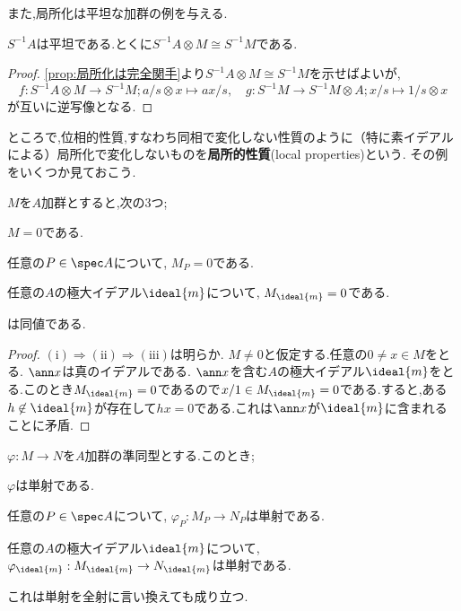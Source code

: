 また,局所化は平坦な加群の例を与える.
\begin{prop}\label{prop:局所化は平坦}
	$S^{-1}A$は平坦である.とくに$S^{-1}A\otimes M\cong S^{-1}M$である.
\end{prop}

\begin{proof}
	\ref{prop:局所化は完全関手}より$S^{-1}A\otimes M\cong S^{-1}M$を示せばよいが,	
	\[f:S^{-1}A\otimes M\to S^{-1}M;a/s\otimes x\mapsto ax/s,\quad g:S^{-1}M\to S^{-1}M\otimes A;x/s\mapsto 1/s\otimes x\]
	が互いに逆写像となる.
\end{proof}

ところで,位相的性質,すなわち同相で変化しない性質のように（特に素イデアルによる）局所化で変化しないものを\textbf{局所的性質}(local properties)という. その例をいくつか見ておこう.

\begin{prop}\label{prop:局所化したら0は局所的}
	$M$を$A$加群とすると,次の3つ;
	\begin{sakura}
		\item $M=0$である.
		\item 任意の$P\in \spec A$について, $M_P=0$である.
		\item 任意の$A$の極大イデアル$\ideal{m}$について, $M_{\ideal{m}}=0$である.
	\end{sakura}
	は同値である.
\end{prop}

\begin{proof}
	$(\text{i})\Longrightarrow(\text{ii})\Longrightarrow(\text{iii})$は明らか. $M\neq0$と仮定する.任意の$0\neq x\in M$をとる. $\ann x$は真のイデアルである. $\ann x$を含む$A$の極大イデアル$\ideal{m}$をとる.このとき$M_{\ideal{m}}=0$であるので$x/1\in M_{\ideal{m}}=0$である.すると,ある$h\not\in\ideal{m}$が存在して$hx=0$である.これは$\ann x$が$\ideal{m}$に含まれることに矛盾.
\end{proof}

\begin{prop}\label{prop:局所的性質}
	$\varphi:M\to N$を$A$加群の準同型とする.このとき;
	\begin{sakura}
		\item $\varphi$は単射である.
		\item 任意の$P\in\spec A$について, $\varphi_P:M_P\to N_P$は単射である.
		\item 任意の$A$の極大イデアル$\ideal{m}$について, 
		$\varphi_{\ideal{m}}:M_{\ideal{m}}\to N_{\ideal{m}}$は単射である.
	\end{sakura}
	これは単射を全射に言い換えても成り立つ.
\end{prop}

